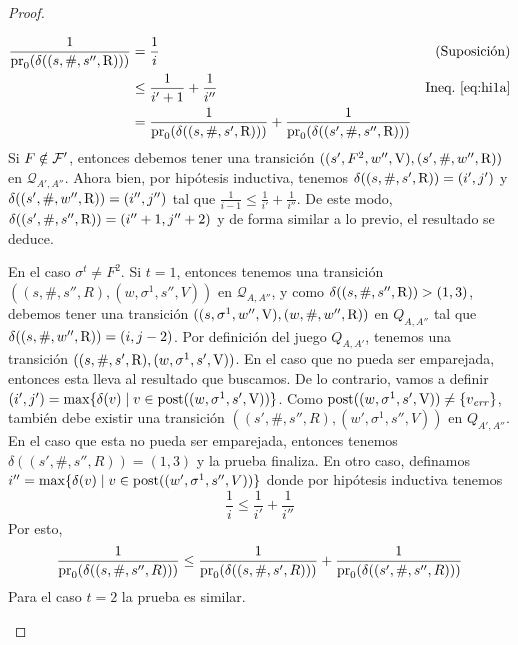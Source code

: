 \begin{proof}
\begin{description}
\begin{align*}
	\frac{1}{\operatorname{pr}_{0}(\delta((s,\#, s'', \mathrm{R})))} & = \frac{1}{i} & \text{(Suposición)} \\
									      & \leq \frac{1}{i'+1} + \frac{1}{i''} & \text{Ineq.~\ref{eq:hi1a}} \\
									      &  = \frac{1}{\operatorname{pr}_{0}(\delta((s, \#, s', \mathrm{R})))} +  \frac{1}{\operatorname{pr}_{0}(\delta((s', \#, s'', \mathrm{R})))} &
\end{align*}
	Si $F \notin \mathcal{F}'$, entonces debemos tener una transición $((s', F^2, w'', \mathrm{V}), (s', \#, w'', \mathrm{R}))$ en $\mathcal{Q}_{A',A''}$. 
Ahora bien, por hipótesis inductiva, tenemos $\delta((s, \#, s', \mathrm{R})) = (i',j')$ y $\delta((s', \#, w'', \mathrm{R})) = (i'',j'')$ tal que 
$\frac{1}{i-1} \leq \frac{1}{i'} + \frac{1}{i''}$. De este modo, $\delta((s', \#, s'', \mathrm{R})) = (i''+1, j''+2)$ y de forma similar a lo previo, el resultado se deduce.

	En el caso $\sigma^t \neq F^2$. Si $t=1$, entonces tenemos una transición $((s, \#, s'', R), (w, \sigma^1, s'', V))$ en $\mathcal{Q}_{A,A''}$, y 
	como $\delta((s, \#, s'', \mathrm{R})) > (1,3)$,
debemos tener una transición $((s, \sigma^1, w'', \mathrm{V}), (w, \#, w'', \mathrm{R}))$ en $Q_{A,A''}$ tal que $\delta((s, \#, w'', \mathrm{R})) = (i,j-2)$. 
Por definición del juego $Q_{A, A'}$, tenemos una transición
$((s, \#, s', \mathrm{R}), (w, \sigma^1, s', \mathrm{V}))$. En el caso que no pueda ser emparejada, entonces esta lleva al resultado que buscamos. De lo contrario, vamos a definir $(i',j') = \max \{\delta(v) \mid v \in \operatorname{post}((w, \sigma^1, s', \mathrm{V})) \}$. 
Como $\operatorname{post}((w, \sigma^1, s', \mathrm{V})) \neq \{v_{\mathit{err}}\}$, también debe existir una transición $((s', \#, s'', R), (w', \sigma^1, s'', V))$ en $Q_{A',A''}$. 
En el caso que esta no pueda ser emparejada, entonces tenemos $\delta((s', \#, s'', R)) = (1,3)$ y la prueba finaliza. 
En otro caso, definamos $i'' = \max \{\delta(v) \mid v \in \operatorname{post}((w', \sigma^1, s'', V)) \}$ donde por hipótesis inductiva tenemos
\begin{equation}
	\frac{1}{i} \leq \frac{1}{i'} + \frac{1}{i''}
\end{equation}	
	Por esto, 
\begin{equation}
	\frac{1}{\operatorname{pr}_{0}(\delta((s, \#, s'', R)))} \leq \frac{1}{\operatorname{pr}_{0}(\delta((s, \#, s', R)))} + \frac{1}{\operatorname{pr}_{0}(\delta((s', \#, s'', R)))}
\end{equation}	
	Para el caso $t=2$ la prueba es similar.
\end{description}


\qedhere
\end{proof}\\


